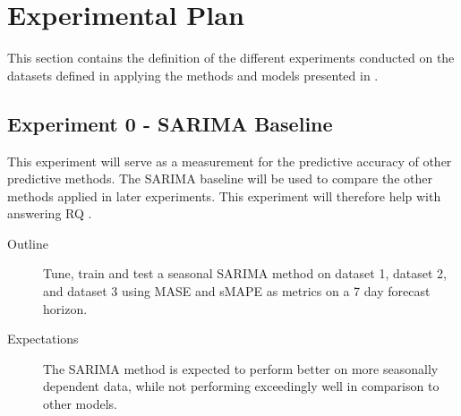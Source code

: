 
\section{Experimental Plan}
\label{section:Results:ExperimentalPlan}

This section contains the definition of the different experiments conducted on the datasets defined in 
applying the methods and models presented in .



\iffalse
  Trying and failing is a major part of research.
  However, to have a chance of success you need a plan driving the experimental research,
  just as you need a plan for your literature search.
  Further, plans are made to be revised and this revision ensures that any further decisions made are in line with the work already completed.

  The plan should include what experiments or series of experiments are planned and what question the individual or set of experiments aim to answer.
  Such questions should be connected to your research questions so that in the evaluation of your results you can discuss the results wrt to the research questions.
\fi


\subsection{Experiment 0 - SARIMA Baseline}
\label{section:results:experimentPlan:Experiment-0}
This experiment will serve as a measurement for the predictive accuracy of other predictive methods.
The SARIMA baseline will be used to compare the other methods applied in later experiments.
This experiment will therefore help with answering RQ .

\begin{description}
  \item[Outline]{
              Tune, train and test a seasonal SARIMA method on dataset 1, dataset 2,
              and dataset 3 using MASE and sMAPE as metrics on a 7 day forecast horizon.
        }
\end{description}

\begin{description}
  \item[Expectations]{
              The SARIMA method is expected to perform better on more seasonally dependent data,
              while not performing exceedingly well in comparison to other models.
        }
\end{description}

